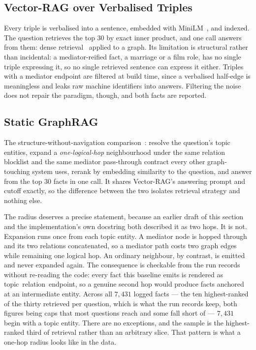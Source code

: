 \subsection{Vector-RAG over Verbalised Triples}

Every triple is verbalised into a sentence, embedded with
MiniLM~\cite{reimers2019sentence}, and indexed. The question retrieves the top
$30$ by exact inner product, and one call answers from them: dense
retrieval~\cite{karpukhin2020dense} applied to a graph. Its limitation is
structural rather than incidental: a mediator-reified fact, a marriage or a film
role, has no single triple expressing it, so no single retrieved sentence can
express it either. Triples with a mediator endpoint are filtered at build time,
since a verbalised half-edge is meaningless and leaks raw machine identifiers
into answers. Filtering the noise does not repair the paradigm, though, and both
facts are reported.

\subsection{Static GraphRAG}\label{sec:baseline-graphrag}

The structure-without-navigation comparison~\cite{edge2024local}: resolve
the question's topic entities, expand a \emph{one-logical-hop}
neighbourhood under the same relation blocklist and the same mediator
pass-through contract every other graph-touching system uses, rerank by
embedding similarity to the question, and answer from the top $30$ facts in one
call. It shares Vector-RAG's answering prompt and cutoff exactly, so the
difference between the two isolates retrieval strategy and nothing else.

The radius deserves a precise statement, because an earlier draft of this
section and the implementation's own docstring both described it as two hops.
It is not. Expansion runs once from each topic entity. A mediator node is
hopped through and its two relations concatenated, so a mediator path costs two
graph edges while remaining one logical hop. An ordinary neighbour, by contrast,
is emitted and never expanded again. The consequence is checkable from the run
records without re-reading the code: every fact this baseline emits is rendered
as \textsf{topic\ relation\ endpoint}, so a genuine second hop would produce
facts anchored at an intermediate entity. Across all $7{,}431$ logged facts ---
the ten highest-ranked of the thirty retrieved per question, which is what the
run records keep, both figures being caps that most questions reach and some
fall short of --- $7{,}431$ begin with a topic entity. There are no exceptions,
and the sample is the highest-ranked third of retrieval rather than an arbitrary
slice. That pattern is what a one-hop radius looks like in the data.

